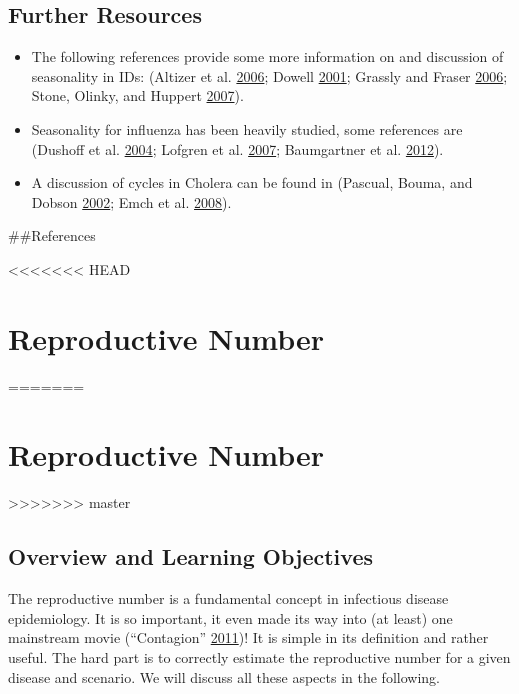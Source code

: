 \documentclass[]{book}
\providecommand{\tightlist}{%
  \setlength{\itemsep}{0pt}\setlength{\parskip}{0pt}}
\theoremstyle{definition}
\theoremstyle{definition}
\theoremstyle{definition}
\theoremstyle{remark}
\begin{document}
\hypertarget{further-resources}{%
\section{Further Resources}\label{further-resources}}

\begin{itemize}
\tightlist
\item
  The following references provide some more information on and
  discussion of seasonality in IDs: (Altizer et al.
  \protect\hyperlink{ref-altizer06}{2006}; Dowell
  \protect\hyperlink{ref-dowell01}{2001}; Grassly and Fraser
  \protect\hyperlink{ref-grassly06}{2006}; Stone, Olinky, and Huppert
  \protect\hyperlink{ref-stone07}{2007}).
\item
  Seasonality for influenza has been heavily studied, some references
  are (Dushoff et al. \protect\hyperlink{ref-dushoff04}{2004}; Lofgren
  et al. \protect\hyperlink{ref-lofgren07}{2007}; Baumgartner et al.
  \protect\hyperlink{ref-baumgartner12}{2012}).
\item
  A discussion of cycles in Cholera can be found in (Pascual, Bouma, and
  Dobson \protect\hyperlink{ref-pascual02}{2002}; Emch et al.
  \protect\hyperlink{ref-emch08}{2008}).
\end{itemize}

\#\#References

<<<<<<< HEAD
\hypertarget{R0}{%
\chapter{Reproductive Number}\label{R0}}
=======
\chapter{Reproductive Number}\label{R0}
>>>>>>> master

\hypertarget{overview-and-learning-objectives-3}{%
\section{Overview and Learning
Objectives}\label{overview-and-learning-objectives-3}}

The reproductive number is a fundamental concept in infectious disease
epidemiology. It is so important, it even made its way into (at least)
one mainstream movie (``Contagion''
\protect\hyperlink{ref-contagionmovie}{2011})! It is simple in its
definition and rather useful. The hard part is to correctly estimate the
reproductive number for a given disease and scenario. We will discuss
all these aspects in the following.
\end{document}
